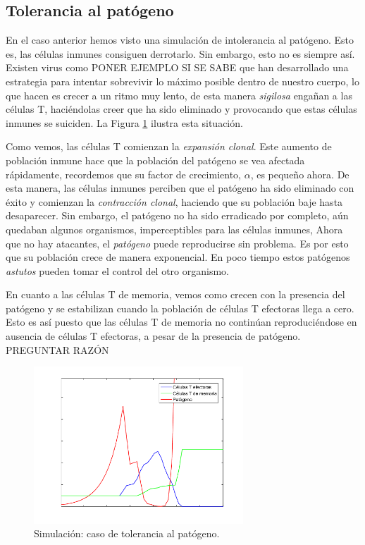 \subsection{Tolerancia al patógeno}

En el caso anterior hemos visto una simulación de intolerancia al patógeno. Esto es, las células inmunes consiguen derrotarlo. Sin embargo, esto no es siempre así. Existen virus como PONER EJEMPLO SI SE SABE que han desarrollado una estrategia para intentar sobrevivir lo máximo posible dentro de nuestro cuerpo, lo que hacen es crecer a un ritmo muy lento, de esta manera \textit{sigilosa} engañan a las células T, haciéndolas creer que ha sido eliminado y provocando que estas células inmunes se suiciden. La Figura \ref{fig:tolerance} ilustra esta situación.

Como vemos, las células T comienzan la \textit{expansión clonal}. Este aumento de población inmune hace que la población del patógeno se vea afectada rápidamente, recordemos que su factor de crecimiento, $\alpha$, es pequeño ahora. De esta manera, las células inmunes perciben que el patógeno ha sido eliminado con éxito y comienzan la \textit{contracción clonal}, haciendo que su población baje hasta desaparecer. Sin embargo, el patógeno no ha sido erradicado por completo, aún quedaban algunos organismos, imperceptibles para las células inmunes, Ahora que no hay atacantes, el \textit{patógeno }puede reproducirse sin problema. Es por esto que su población crece de manera exponencial. En poco tiempo estos patógenos \textit{astutos} pueden tomar el control del otro organismo. 

En cuanto a las células T de memoria, vemos como crecen con la presencia del patógeno y se estabilizan cuando la población de células T efectoras llega a cero. Esto es así puesto que las células T de memoria no continúan reproduciéndose en ausencia de células T efectoras, a pesar de la presencia de patógeno. PREGUNTAR RAZÓN 

\begin{figure}[t]
	\centering
	\includegraphics[width=0.7\textwidth]{Imagenes/Simulaciones/tolerance}
	\caption{Simulación: caso de tolerancia al patógeno.}
	\label{fig:tolerance}
\end{figure}

